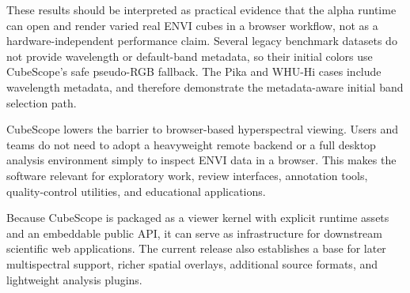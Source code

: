\documentclass[preprint,12pt,a4paper]{elsarticle}
\begin{document}
\begin{table}[!ht]
\centering
{}
\caption{Local real ENVI validation cases. Initial-view time is reported as
median (IQR) in milliseconds across five browser loads. Local source data were
used only for manuscript-side validation and are not redistributed with the
software package.}
\label{tab:real-envi}
\end{table}

These results should be interpreted as practical evidence that the alpha
runtime can open and render varied real ENVI cubes in a browser workflow, not
as a hardware-independent performance claim. Several legacy benchmark datasets
do not provide wavelength or default-band metadata, so their initial colors use
CubeScope's safe pseudo-RGB fallback. The Pika and WHU-Hi cases include
wavelength metadata, and therefore demonstrate the metadata-aware initial band
selection path.

CubeScope lowers the barrier to browser-based hyperspectral viewing. Users and
teams do not need to adopt a heavyweight remote backend or a full desktop
analysis environment simply to inspect ENVI data in a browser. This makes the
software relevant for exploratory work, review interfaces, annotation tools,
quality-control utilities, and educational applications.

Because CubeScope is packaged as a viewer kernel with explicit runtime assets
and an embeddable public API, it can serve as infrastructure for downstream
scientific web applications. The current release also establishes a base for
later multispectral support, richer spatial overlays, additional source
formats, and lightweight analysis plugins.
\end{document}
